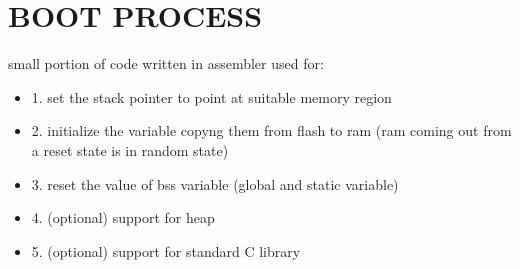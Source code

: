 %	

\section{BOOT PROCESS}
small portion of code written in assembler used for: 
\begin{itemize}
	\item 1. set the stack pointer to point at suitable memory region
	\item 2. initialize the variable copyng them from flash to ram (ram coming out from a reset state is in random state)
	\item 3. reset the value of bss variable (global and static variable)
	\item 4. (optional) support for heap 
	\item 5. (optional) support for standard C library
	\end{itemize}
